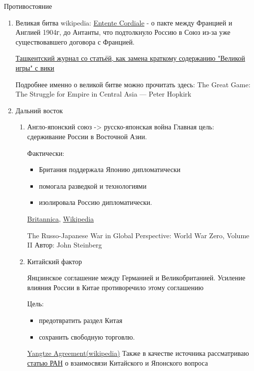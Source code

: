 \documentclass[a4paper, 12pt]{article}
\begin{document}
	
	\newpage
	{\centering \Huge Противостояние}
	\begin{enumerate}
		\item {\Large Великая битва} \newline
		wikipedia: \href{https://en.wikipedia.org/wiki/Entente_Cordiale "Entente Cordiale"}{Entente Cordiale} - о пакте между Францией и Англией 1904г, до Антанты, что подтолкнуло Россию в Союз из-за уже существовавшего договора с Францией.
		
		\href{https://wosjournals.com/index.php/shokh/article/view/5326/5757}{Ташкентский журнал со статьёй, как замена краткому содержанию "Великой игры" с вики}
		
		Подробнее именно о великой битве можно прочитать здесь: The Great Game: The Struggle for Empire in Central Asia — Peter Hopkirk
		
		\item {\Large Дальний восток}
		\begin{enumerate}
			\item {\large Англо-японский союз -> русско-японская война} \newline
			Главная цель: сдерживание России в Восточной Азии.
			
			Фактически:
			\begin{itemize}
				\item Британия поддержала Японию дипломатически
				\item помогала разведкой и технологиями
				\item изолировала Россию дипломатически.
			\end{itemize}
			\href{https://www.britannica.com/topic/Anglo-Japanese-Alliance}{Britannica}, 
			\href{https://en.wikipedia.org/wiki/Anglo-Japanese_Alliance}{Wikipedia}
			
			The Russo-Japanese War in Global Perspective: World War Zero, Volume II
			Автор: John Steinberg
			
			\item {\large Китайский фактор} \newline
			
			Янцзинское соглашение между Германией и Великобританией. Усиление влияния России в Китае противоречило этому соглашению
			
			Цель:
			\begin{itemize}
				\item предотвратить раздел Китая
				\item сохранить свободную торговлю.
			\end{itemize}
			\href{https://en.wikipedia.org/wiki/Yangtze_Agreement}{Yangtze Agreement(wikipedia)}
			Также в качестве источника рассматриваю \href{https://www.fnisc.ru/index.php?id=2395&j=2&jn=vlast&page_id=3086&printmode}{статью РАН} о взаимосвязи Китайского и Японского вопроса
			

\end{enumerate}
\end{enumerate}
\end{document}
